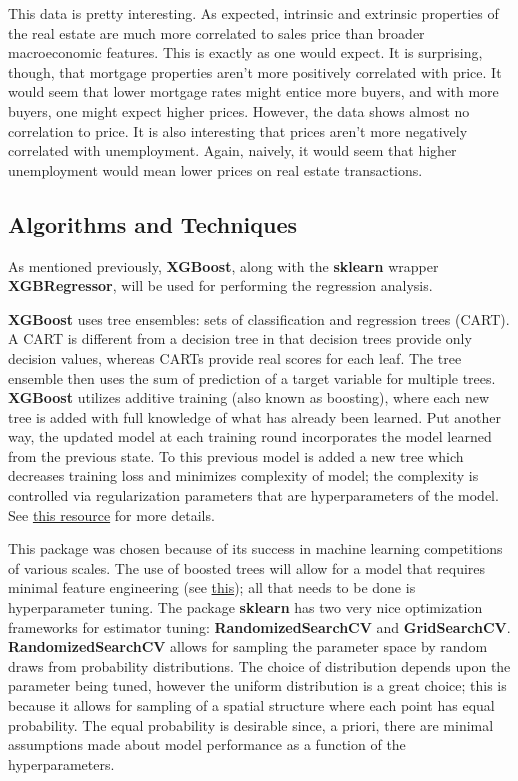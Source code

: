 \documentclass[12pt]{article}
\theoremstyle{plain} %
\theoremstyle{definition} %
\theoremstyle{remark} %
\begin{document}
This data is pretty interesting.  As expected, intrinsic and extrinsic properties of the real estate are much more correlated to sales price than broader macroeconomic features.  This is exactly as one would expect.  It is surprising, though, that mortgage properties aren't more positively correlated with price.  It would seem that lower mortgage rates might entice more buyers, and with more buyers, one might expect higher prices.  However, the data shows almost no correlation to price.  It is also interesting that prices aren't more negatively correlated with unemployment.  Again, naively, it would seem that higher unemployment would mean lower prices on real estate transactions.

\subsection*{Algorithms and Techniques}
\indent \par As mentioned previously, \textbf{XGBoost}, along with the \textbf{sklearn} wrapper \textbf{XGBRegressor}, will be used for performing the regression analysis.  

\par \textbf{XGBoost} uses tree ensembles: sets of classification and regression trees (CART).  A CART is different from a decision tree in that decision trees provide only decision values, whereas CARTs provide real scores for each leaf.  The tree ensemble then uses the sum of prediction of a target variable for multiple trees.  \textbf{XGBoost} utilizes additive training (also known as boosting), where each new tree is added with full knowledge of what has already been learned.  Put another way, the updated model at each training round incorporates the model learned from the previous state.  To this previous model is added a new tree which decreases training loss and minimizes complexity of model; the complexity is controlled via regularization parameters that are hyperparameters of the model.  See \href{http://xgboost.readthedocs.io/en/latest/model.html}{this resource} for more details.

\par This package was chosen because of its success in machine learning competitions of various scales.  The use of boosted trees will allow for a model that requires minimal feature engineering (see \href{https://www.kaggle.com/c/allstate-claims-severity/discussion/24500}{this}); all that needs to be done is hyperparameter tuning.  The package \textbf{sklearn} has two very nice optimization frameworks for estimator tuning: \textbf{RandomizedSearchCV} and \textbf{GridSearchCV}.  \textbf{RandomizedSearchCV} allows for sampling the parameter space by random draws from probability distributions.  The choice of distribution depends upon the parameter being tuned, however the uniform distribution is a great choice; this is because it allows for sampling of a spatial structure where each point has equal probability.  The equal probability is desirable since, a priori, there are minimal assumptions made about model performance as a function of the hyperparameters.
\end{document}
